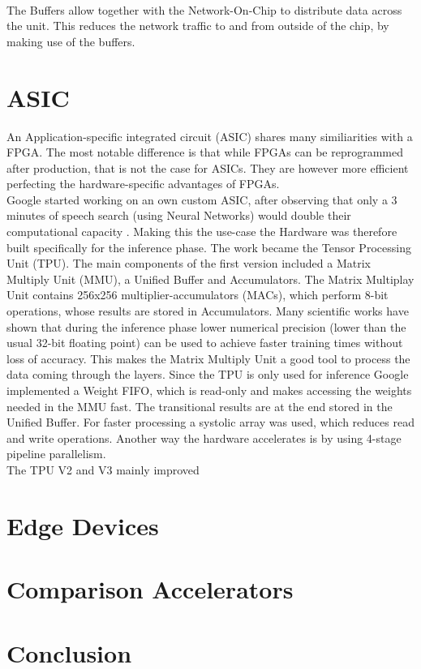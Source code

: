 \documentclass[conference]{IEEEtran}
\begin{document}
\\
The Buffers allow together with the Network-On-Chip to distribute data across the unit. This reduces the network traffic to and from outside of the chip, by making use of the buffers. 
\\

\section{ASIC}
An Application-specific integrated circuit (ASIC) shares many similiarities with a FPGA. The most notable difference is that while FPGAs can be reprogrammed after production, that is not the case for ASICs. They are however more efficient perfecting the hardware-specific advantages of FPGAs.
\\
Google started working on an own custom ASIC, after observing that only a 3 minutes of speech search (using Neural Networks) would double their computational capacity \cite{jouppi2017datacenter}. Making this the use-case the Hardware was therefore built specifically for the inference phase. The work became the Tensor Processing Unit (TPU). The main components of the first version included a Matrix Multiply Unit (MMU), a Unified Buffer and Accumulators. The Matrix Multiplay Unit contains 256x256 multiplier-accumulators (MACs), which perform 8-bit operations, whose results are stored in Accumulators. Many scientific works have shown that during the inference phase lower numerical precision (lower than the usual 32-bit floating point) can be used to achieve faster training times without loss of accuracy\cite{rodriguez2018lower}. This makes the Matrix Multiply Unit a good tool to process the data coming through the layers. Since the TPU is only used for inference Google implemented a Weight FIFO, which is read-only and makes accessing the weights needed in the MMU fast. The transitional results are at the end stored in the Unified Buffer. For faster processing a systolic array was used, which reduces read and write operations. Another way the hardware accelerates is by using 4-stage pipeline parallelism.
\\
The TPU V2 and V3 mainly improved 
\section{Edge Devices}

\section{Comparison Accelerators}


\section{Conclusion}

\newpage
\quad
\newpage


\end{document}
